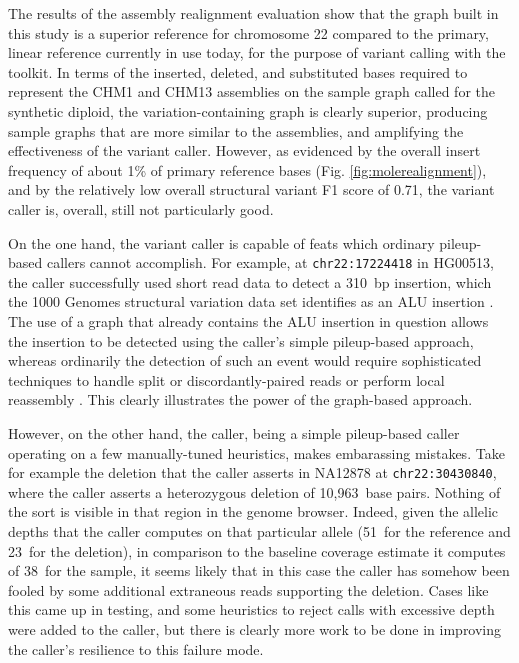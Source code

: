 The results of the assembly realignment evaluation show that the graph built in this study is a superior reference for chromosome 22 compared to the primary, linear reference currently in use today, for the purpose of variant calling with the \vg toolkit. In terms of the inserted, deleted, and substituted bases required to represent the CHM1 and CHM13 assemblies on the sample graph called for the synthetic diploid, the variation-containing graph is clearly superior, producing sample graphs that are more similar to the assemblies, and amplifying the effectiveness of the variant caller. However, as evidenced by the overall insert frequency of about 1\% of primary reference bases (Fig. \ref{fig:molerealignment}), and by the relatively low overall structural variant F1 score of 0.71, the \vg variant caller is, overall, still not particularly good.

On the one hand, the \vg variant caller is capable of feats which ordinary pileup-based callers cannot accomplish. For example, at \texttt{chr22:17224418} in HG00513, the \vg caller successfully used short read data to detect a 310~bp insertion, which the 1000 Genomes structural variation data set identifies as an ALU insertion \cite{sudmant2015integrated}. The use of a graph that already contains the ALU insertion in question allows the insertion to be detected using the \vg caller's simple pileup-based approach, whereas ordinarily the detection of such an event would require sophisticated techniques to handle split or discordantly-paired reads or perform local reassembly \cite{wildschutte2015discovery}. This clearly illustrates the power of the graph-based approach.


However, on the other hand, the \vg caller, being a simple pileup-based caller operating on a few manually-tuned heuristics, makes embarassing mistakes. Take for example the deletion that the caller asserts in NA12878 at \texttt{chr22:30430840}, where the caller asserts a heterozygous deletion of 10,963~base pairs. Nothing of the sort is visible in that region in the genome browser. Indeed, given the allelic depths that the caller computes on that particular allele (51~for the reference and 23~for the deletion), in comparison to the baseline coverage estimate it computes of 38~for the sample, it seems likely that in this case the caller has somehow been fooled by some additional extraneous reads supporting the deletion. Cases like this came up in testing, and some heuristics to reject calls with excessive depth were added to the caller, but there is clearly more work to be done in improving the caller's resilience to this failure mode.

